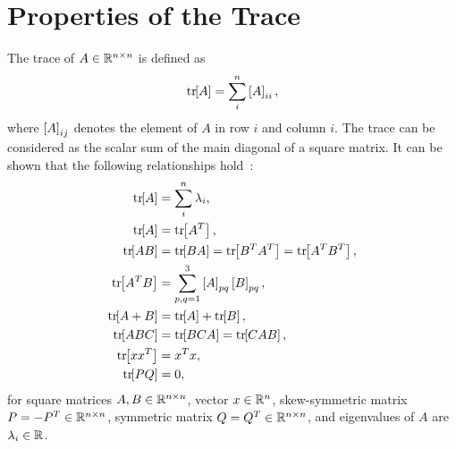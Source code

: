 
\chapter{Properties of the Trace}\label{chap:trace}

The trace of \( A \in \mathbb{R}^{n \times n} \) is defined as
\begin{align}
    \mathrm{tr}\negthickspace\left[ A \right] = \sum_i^n \left[ A \right]_{ii},
\end{align}
where \( \left[ A \right]_{ij} \) denotes the element of \( A \) in row \( i \) and column \( i \).
The trace can be considered as the scalar sum of the main diagonal of a square matrix.
It can be shown that the following relationships hold~\cite{petersen2008,strang2008}:
\begin{align}
    \tr{A} &= \sum_i^n \lambda_i, \label{eq:treig}\\
    \tr{A} &= \tr{A^T}, \label{eq:trAT} \\
    \tr{A B} &= \tr{B A} = \tr{B^T A^T} = \tr{A^T B^T}, \label{eq:trAB} \\
    \tr{A^T B } &= \sum_{p, q=1}^3 \bracket{A}_{pq} \bracket{B}_{pq}, \label{eq:trATB} \\
    \tr{A+B} &= \tr{A} + \tr{B}, \label{eq:trApB} \\
    \tr{ABC} &= \tr{BCA} = \tr{CAB}, \label{eq:trABC}\\
    \tr{\vc{x}\vc{x}^T} &= \vc{x}^T \vc{x}, \label{eq:trxxT} \\
    \tr{PQ} &= 0, \label{eq:trPQ}
\end{align}
for square matrices \( A, B \in \mathbb{R}^{n \times n} \), vector \( x \in \mathbb{R}^n\), skew-symmetric matrix \( P = -P^T \in \mathbb{R}^{n\times n} \), symmetric matrix \( Q = Q^T \in \mathbb{R}^{n \times n} \), and eigenvalues of \( A \) are \( \lambda_i \in \mathbb{R} \).
